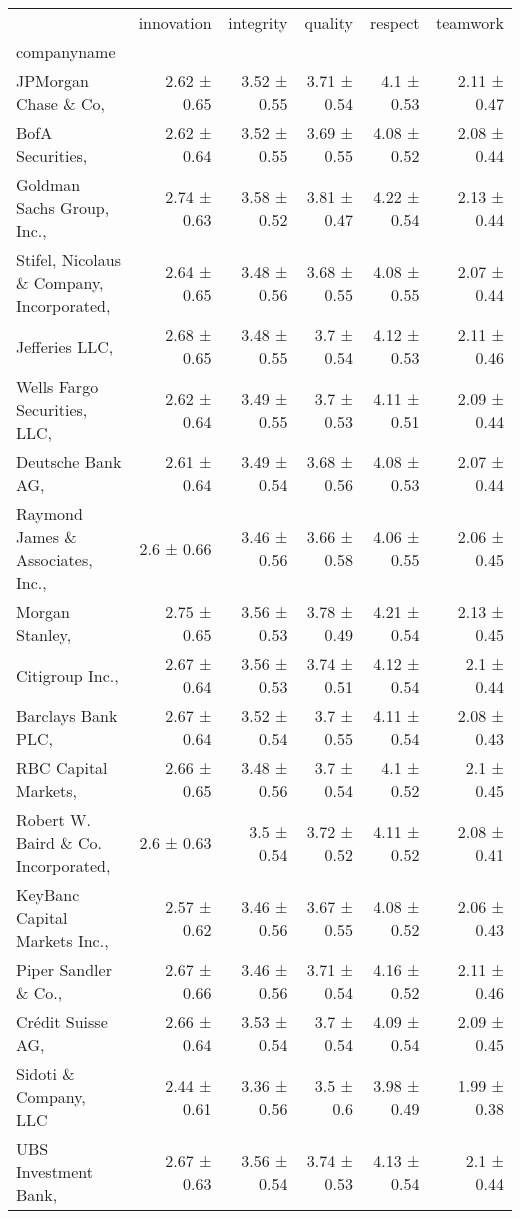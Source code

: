 \begin{tabular}{lrrrrr}
\toprule
 & innovation & integrity & quality & respect & teamwork \\
companyname &  &  &  &  &  \\
\midrule
JPMorgan Chase \& Co,  & 2.62 ± 0.65 & 3.52 ± 0.55 & 3.71 ± 0.54 & 4.1 ± 0.53 & 2.11 ± 0.47 \\
BofA Securities,  & 2.62 ± 0.64 & 3.52 ± 0.55 & 3.69 ± 0.55 & 4.08 ± 0.52 & 2.08 ± 0.44 \\
Goldman Sachs Group, Inc.,  & 2.74 ± 0.63 & 3.58 ± 0.52 & 3.81 ± 0.47 & 4.22 ± 0.54 & 2.13 ± 0.44 \\
Stifel, Nicolaus \& Company, Incorporated,  & 2.64 ± 0.65 & 3.48 ± 0.56 & 3.68 ± 0.55 & 4.08 ± 0.55 & 2.07 ± 0.44 \\
Jefferies LLC,  & 2.68 ± 0.65 & 3.48 ± 0.55 & 3.7 ± 0.54 & 4.12 ± 0.53 & 2.11 ± 0.46 \\
Wells Fargo Securities, LLC,  & 2.62 ± 0.64 & 3.49 ± 0.55 & 3.7 ± 0.53 & 4.11 ± 0.51 & 2.09 ± 0.44 \\
Deutsche Bank AG,  & 2.61 ± 0.64 & 3.49 ± 0.54 & 3.68 ± 0.56 & 4.08 ± 0.53 & 2.07 ± 0.44 \\
Raymond James \& Associates, Inc.,  & 2.6 ± 0.66 & 3.46 ± 0.56 & 3.66 ± 0.58 & 4.06 ± 0.55 & 2.06 ± 0.45 \\
Morgan Stanley,  & 2.75 ± 0.65 & 3.56 ± 0.53 & 3.78 ± 0.49 & 4.21 ± 0.54 & 2.13 ± 0.45 \\
Citigroup Inc.,  & 2.67 ± 0.64 & 3.56 ± 0.53 & 3.74 ± 0.51 & 4.12 ± 0.54 & 2.1 ± 0.44 \\
Barclays Bank PLC,  & 2.67 ± 0.64 & 3.52 ± 0.54 & 3.7 ± 0.55 & 4.11 ± 0.54 & 2.08 ± 0.43 \\
RBC Capital Markets,  & 2.66 ± 0.65 & 3.48 ± 0.56 & 3.7 ± 0.54 & 4.1 ± 0.52 & 2.1 ± 0.45 \\
Robert W. Baird \& Co. Incorporated,  & 2.6 ± 0.63 & 3.5 ± 0.54 & 3.72 ± 0.52 & 4.11 ± 0.52 & 2.08 ± 0.41 \\
KeyBanc Capital Markets Inc.,  & 2.57 ± 0.62 & 3.46 ± 0.56 & 3.67 ± 0.55 & 4.08 ± 0.52 & 2.06 ± 0.43 \\
Piper Sandler \& Co.,  & 2.67 ± 0.66 & 3.46 ± 0.56 & 3.71 ± 0.54 & 4.16 ± 0.52 & 2.11 ± 0.46 \\
Cr\'edit Suisse AG,  & 2.66 ± 0.64 & 3.53 ± 0.54 & 3.7 ± 0.54 & 4.09 ± 0.54 & 2.09 ± 0.45 \\
Sidoti \& Company, LLC & 2.44 ± 0.61 & 3.36 ± 0.56 & 3.5 ± 0.6 & 3.98 ± 0.49 & 1.99 ± 0.38 \\
UBS Investment Bank,  & 2.67 ± 0.63 & 3.56 ± 0.54 & 3.74 ± 0.53 & 4.13 ± 0.54 & 2.1 ± 0.44 \\

\end{tabular}
